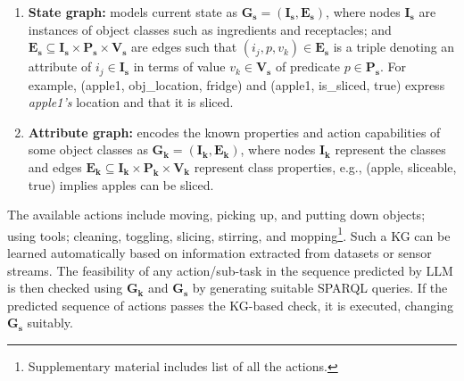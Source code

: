 \begin{enumerate}
\vspace{-0.75em}
\item \textbf{State graph:} models current state as $\mathbf{G_s} = (\mathbf{I_s}, \mathbf{E_s})$, where nodes $\mathbf{I_s}$ are instances of object classes such as ingredients and receptacles; and $\mathbf{E_s} \subseteq \mathbf{I_s} \times \mathbf{P_s} \times \mathbf{V_s}$ are edges such that $(i_j, p, v_k) \in \mathbf{E_s}$ is a triple denoting an attribute of $i_j \in \mathbf{I_s}$ in terms of value $v_k \in \mathbf{V_s}$ of predicate $p \in \mathbf{P_s}$. For example, (apple1, obj\_location, fridge) and (apple1, is\_sliced, true) express \textit{apple1's} location and that it is sliced.
\item \textbf{Attribute graph:} encodes the known properties and action capabilities of some object classes as $\mathbf{G_k} = (\mathbf{I_k}, \mathbf{E_k})$, where nodes $\mathbf{I_k}$ represent the classes and edges $\mathbf{E_k} \subseteq \mathbf{I_k} \times \mathbf{P_k} \times \mathbf{V_k}$ represent class properties, e.g., (apple, sliceable, true) implies  apples can be sliced.
\vspace{-0.75em}
\end{enumerate}
The available actions include moving, picking up, and putting down objects; using tools; cleaning, toggling, slicing, stirring, and mopping\footnote{Supplementary material includes list of all the actions.}. Such a KG can be learned automatically based on information extracted from datasets or sensor streams. The feasibility of any action/sub-task in the sequence predicted by LLM is then checked using $\mathbf{G_k}$ and $\mathbf{G_s}$ by generating suitable SPARQL queries. If the predicted sequence of actions passes the KG-based check, it is executed, changing $\mathbf{G_s}$ suitably.
